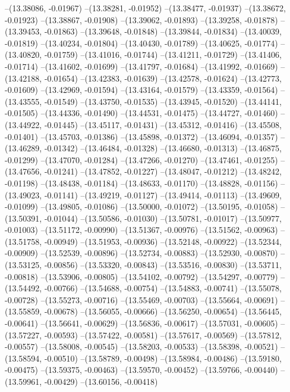 --(13.38086, -0.01967)
--(13.38281, -0.01952)
--(13.38477, -0.01937)
--(13.38672, -0.01923)
--(13.38867, -0.01908)
--(13.39062, -0.01893)
--(13.39258, -0.01878)
--(13.39453, -0.01863)
--(13.39648, -0.01848)
--(13.39844, -0.01834)
--(13.40039, -0.01819)
--(13.40234, -0.01804)
--(13.40430, -0.01789)
--(13.40625, -0.01774)
--(13.40820, -0.01759)
--(13.41016, -0.01744)
--(13.41211, -0.01729)
--(13.41406, -0.01714)
--(13.41602, -0.01699)
--(13.41797, -0.01684)
--(13.41992, -0.01669)
--(13.42188, -0.01654)
--(13.42383, -0.01639)
--(13.42578, -0.01624)
--(13.42773, -0.01609)
--(13.42969, -0.01594)
--(13.43164, -0.01579)
--(13.43359, -0.01564)
--(13.43555, -0.01549)
--(13.43750, -0.01535)
--(13.43945, -0.01520)
--(13.44141, -0.01505)
--(13.44336, -0.01490)
--(13.44531, -0.01475)
--(13.44727, -0.01460)
--(13.44922, -0.01445)
--(13.45117, -0.01431)
--(13.45312, -0.01416)
--(13.45508, -0.01401)
--(13.45703, -0.01386)
--(13.45898, -0.01372)
--(13.46094, -0.01357)
--(13.46289, -0.01342)
--(13.46484, -0.01328)
--(13.46680, -0.01313)
--(13.46875, -0.01299)
--(13.47070, -0.01284)
--(13.47266, -0.01270)
--(13.47461, -0.01255)
--(13.47656, -0.01241)
--(13.47852, -0.01227)
--(13.48047, -0.01212)
--(13.48242, -0.01198)
--(13.48438, -0.01184)
--(13.48633, -0.01170)
--(13.48828, -0.01156)
--(13.49023, -0.01141)
--(13.49219, -0.01127)
--(13.49414, -0.01113)
--(13.49609, -0.01099)
--(13.49805, -0.01086)
--(13.50000, -0.01072)
--(13.50195, -0.01058)
--(13.50391, -0.01044)
--(13.50586, -0.01030)
--(13.50781, -0.01017)
--(13.50977, -0.01003)
--(13.51172, -0.00990)
--(13.51367, -0.00976)
--(13.51562, -0.00963)
--(13.51758, -0.00949)
--(13.51953, -0.00936)
--(13.52148, -0.00922)
--(13.52344, -0.00909)
--(13.52539, -0.00896)
--(13.52734, -0.00883)
--(13.52930, -0.00870)
--(13.53125, -0.00856)
--(13.53320, -0.00843)
--(13.53516, -0.00830)
--(13.53711, -0.00818)
--(13.53906, -0.00805)
--(13.54102, -0.00792)
--(13.54297, -0.00779)
--(13.54492, -0.00766)
--(13.54688, -0.00754)
--(13.54883, -0.00741)
--(13.55078, -0.00728)
--(13.55273, -0.00716)
--(13.55469, -0.00703)
--(13.55664, -0.00691)
--(13.55859, -0.00678)
--(13.56055, -0.00666)
--(13.56250, -0.00654)
--(13.56445, -0.00641)
--(13.56641, -0.00629)
--(13.56836, -0.00617)
--(13.57031, -0.00605)
--(13.57227, -0.00593)
--(13.57422, -0.00581)
--(13.57617, -0.00569)
--(13.57812, -0.00557)
--(13.58008, -0.00545)
--(13.58203, -0.00533)
--(13.58398, -0.00521)
--(13.58594, -0.00510)
--(13.58789, -0.00498)
--(13.58984, -0.00486)
--(13.59180, -0.00475)
--(13.59375, -0.00463)
--(13.59570, -0.00452)
--(13.59766, -0.00440)
--(13.59961, -0.00429)
--(13.60156, -0.00418)
